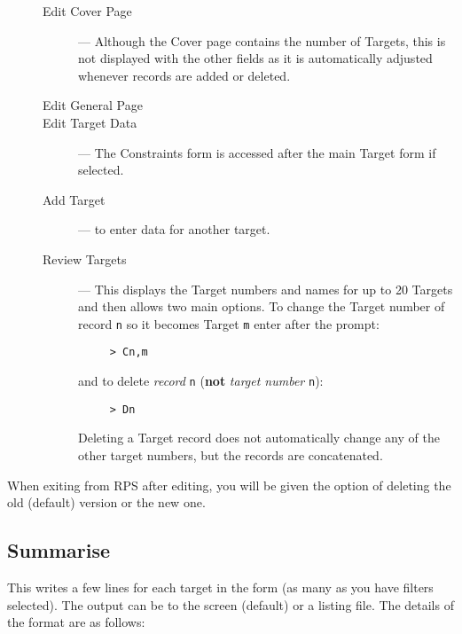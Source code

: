 \begin{description}
\item[\mbox{}]\mbox{}
\begin{description}

\item [Edit Cover Page] --- Although the Cover page contains the number
of Targets, this is not displayed with the other fields as it is
automatically adjusted whenever records are added or deleted.

\item [Edit General Page] 

\item [Edit Target Data] --- The Constraints form is accessed after the
main Target form if selected.

\item [Add Target] --- to enter data for another target.

\item [Review Targets] --- This displays the Target numbers and names
for up to 20 Targets and then allows two main options. To change the
Target number of record {\tt n} so it becomes Target {\tt m} enter
after the prompt:

\begin{verbatim}
     > Cn,m
\end{verbatim}

and to delete {\em record} {\tt n} ({\bf not} {\em target number} {\tt n}):

\begin{verbatim}
     > Dn
\end{verbatim}

Deleting a Target record does not automatically change any of the other
target numbers, but the records are concatenated.

\end{description}
\end{description}

When exiting from RPS after editing, you will be given the option of
deleting the old (default) version or the new one.

\subsection{Summarise}

This writes a few lines for each target in the form (as many as you
have filters selected).  The output can be to the screen (default) or a
listing file.  The details of the format are as follows:

